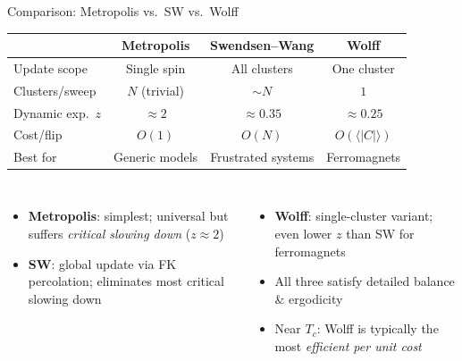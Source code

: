 \documentclass[10pt,aspectratio=169]{beamer}
\begin{document}
\begin{frame}{Comparison: Metropolis vs.\ SW vs.\ Wolff}
  \centering
  \vspace{-0.3em}
  \begin{tabular}{@{}lccc@{}}
    \toprule
    & \textbf{Metropolis} & \textbf{Swendsen--Wang} & \textbf{Wolff} \\
    \midrule
    Update scope & Single spin & All clusters & One cluster \\
    Clusters/sweep & $N$ (trivial) & $\sim N$ & $1$ \\
    Dynamic exp.\ $z$ & $\approx 2$ & $\approx 0.35$ & $\approx 0.25$ \\
    Cost/flip & $O(1)$ & $O(N)$ & $O(\langle|C|\rangle)$ \\
    Best for & Generic models & Frustrated systems & Ferromagnets \\
    \bottomrule
  \end{tabular}
  \vspace{0.5em}

  \begin{columns}[T]
    \begin{itemize}\small
      \item \textbf{Metropolis}: simplest; universal but suffers \emph{critical slowing down} ($z \approx 2$)
      \item \textbf{SW}: global update via FK percolation; eliminates most critical slowing down
    \end{itemize}
    \begin{itemize}\small
      \item \textbf{Wolff}: single-cluster variant; even lower $z$ than SW for ferromagnets
      \item All three satisfy detailed balance \& ergodicity
      \item Near $T_c$: Wolff is typically the most \emph{efficient per unit cost}
    \end{itemize}
  \end{columns}
\end{frame}
\end{document}
